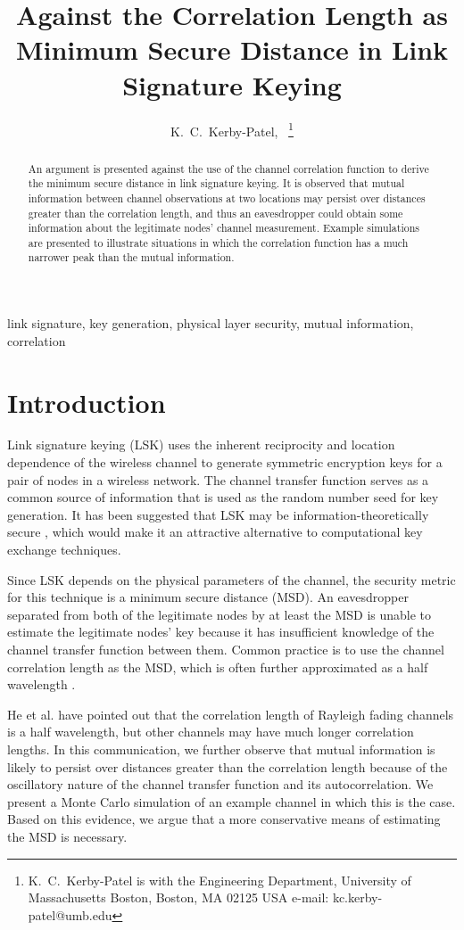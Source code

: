 \documentclass[journal]{ieeetran}
\title{Against the Correlation Length as Minimum Secure Distance in Link Signature Keying}
\author{K.~C.~Kerby-Patel,~\IEEEmembership{Senior Member, IEEE}
\thanks{K.~C.~Kerby-Patel is with the Engineering Department, University of Massachusetts Boston, Boston, MA 02125 USA e-mail: kc.kerby-patel@umb.edu}}%
\begin{document}
\maketitle
\begin{abstract}
An argument is presented against the use of the channel correlation function to derive the minimum secure distance in link signature keying.  It is observed that mutual information between channel observations at two locations may persist over distances greater than the correlation length, and thus an eavesdropper could obtain some information about the legitimate nodes' channel measurement.  Example simulations are presented to illustrate situations in which the correlation function has a much narrower peak than the mutual information.
\end{abstract}
\begin{IEEEkeywords}
link signature, key generation, physical layer security, mutual information, correlation
\end{IEEEkeywords}
\IEEEpeerreviewmaketitle

\section{Introduction}
Link signature keying (LSK) uses the inherent reciprocity and location dependence of the wireless channel to generate symmetric encryption keys for a pair of nodes in a wireless network.  The channel transfer function serves as a common source of information that is used as the random number seed for key generation.  It has been suggested that LSK may be information-theoretically secure \cite{ye2010}, which would make it an attractive alternative to computational key exchange techniques.
	
Since LSK depends on the physical parameters of the channel, the security metric for this technique is a minimum secure distance (MSD).  An eavesdropper separated from both of the legitimate nodes by at least the MSD is unable to estimate the legitimate nodes' key because it has insufficient knowledge of the channel transfer function between them.  Common practice is to use the channel correlation length as the MSD, which is often further approximated as a half wavelength \cite{azimisadjadi2007, bloch2008, mathur2008, ye2010}. 

He et al. \cite{he2013} have pointed out that the correlation length of Rayleigh fading channels is a half wavelength, but other channels may have much longer correlation lengths.  In this communication, we further observe that mutual information is likely to persist over distances greater than the correlation length because of the oscillatory nature of the channel transfer function and its autocorrelation.  We present a Monte Carlo simulation of an example channel in which this is the case.  Based on this evidence, we argue that a more conservative means of estimating the MSD is necessary.
\end{document}

